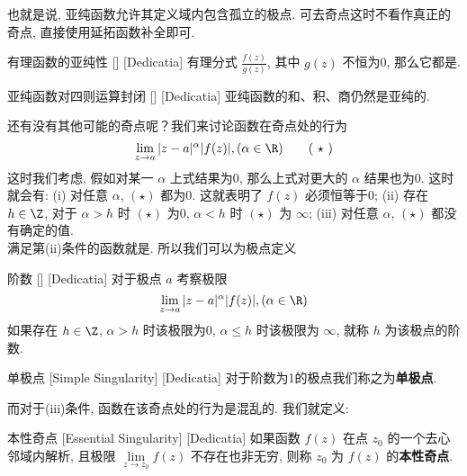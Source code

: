 \documentclass[UTF8]{ctexart}
\begin{document}
        也就是说, 亚纯函数允许其定义域内包含孤立的极点. 可去奇点这时不看作真正的奇点, 直接使用延拓函数补全即可. 

        \begin{crl}
            [UUID]
            {有理函数的亚纯性}
            []
            [Dedicatia]
            有理分式 \(\frac{f(z)}{g(z)}\), 其中 \(g(z)\) 不恒为0, 那么它都是\MeromorphicFunction.
        \end{crl}

        \begin{ppt}
            [UUID]
            {亚纯函数对四则运算封闭}
            []
            [Dedicatia]
            亚纯函数的和、积、商仍然是亚纯的. 
        \end{ppt}

        还有没有其他可能的奇点呢？我们来讨论函数在奇点处的行为
        \[\lim_{z\to a}|z-a|^\alpha |f(z)|, (\alpha\in\R)\tag{ \(\star\) }\]
        这时我们考虑, 假如对某一 \(\alpha\) 上式结果为0, 那么上式对更大的 \(\alpha\) 结果也为0. 这时就会有: (i) 对任意 \(\alpha\),  \((\star)\) 都为0. 这就表明了 \(f(z)\) 必须恒等于0; (ii) 存在 \(h\in\Z\), 对于 \(\alpha>h\) 时 \((\star)\) 为0,  \(\alpha<h\) 时 \((\star)\) 为 \(\infty\); (iii) 对任意 \(\alpha\),  \((\star)\) 都没有确定的值. \\
        满足第(ii)条件的函数就是\MeromorphicFunction. 所以我们可以为极点定义

        \begin{dfn}
            [UUID]
            {阶数}
            []
            [Dedicatia]
            对于极点 \(a\) 考察极限
            \[\lim_{z\to a}|z-a|^\alpha |f(z)|, (\alpha\in\R)\]
            如果存在 \(h\in\Z\),  \(\alpha>h\) 时该极限为0,  \(\alpha\leq h\) 时该极限为 \(\infty\), 就称 \(h\) 为该极点的阶数. 
        \end{dfn}

        \begin{dfn}
            [SimpleSingularity]
            {单极点}
            [Simple Singularity]
            [Dedicatia]
            对于阶数为1的极点我们称之为\textbf{单极点}. 
        \end{dfn}

        而对于(iii)条件, 函数在该奇点处的行为是混乱的. 我们就定义: 

        \begin{dfn}
            [EssentialSingularity]
            {本性奇点}
            [Essential Singularity]
            [Dedicatia]
            如果函数 \(f(z)\) 在点 \(z_0\) 的一个去心邻域内解析, 且极限 \(\lim\limits_{z \to z_0} f(z)\) 不存在也非无穷, 则称 \(z_0\) 为 \(f(z)\) 的\textbf{本性奇点}. 
        \end{dfn}
\end{document}
